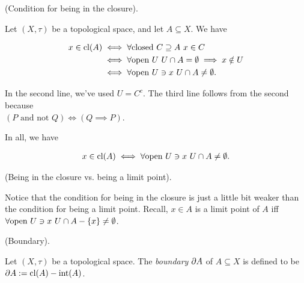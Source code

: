 \begin{theorem}
    (Condition for being in the closure).
    
    Let $(X, \tau)$ be a topological space, and let $A \subseteq X$. We have
    
    \begin{align*}
        x \in \text{cl}(A) &\iff \forall \text{closed } C \supseteq A \text{ } x \in C \\
        &\iff \forall \text{open } U \text{ } U \cap A = \emptyset \implies x \notin U \\
        &\iff \forall \text{open } U \ni x \text{ } U \cap A \neq \emptyset.
    \end{align*}
    
    In the second line, we've used $U = C^c$. The third line follows from the second because \\ ${(P \text{ and } \text{not } Q) \iff (Q \implies P)}$.
    
    In all, we have 
    
    \begin{align*}
        x \in \text{cl}(A) \iff \forall \text{open } U \ni x \text{ } U \cap A \neq \emptyset.
    \end{align*}
\end{theorem}

\begin{remark}
     (Being in the closure vs. being a limit point).
     
     Notice that the condition for being in the closure is just a little bit weaker than the condition for being a limit point. Recall, $x \in A$ is a limit point of $A$ iff $\forall \text{open } U \ni x \text{ } U \cap A - \{x\} \neq \emptyset$.
\end{remark}

    


\begin{defn}
    (Boundary).
    
    Let $(X, \tau)$ be a topological space. The \textit{boundary} $\partial A$ of $A \subseteq X$ is defined to be $\partial A := \text{cl}(A) - \text{int}(A)$.
\end{defn}


